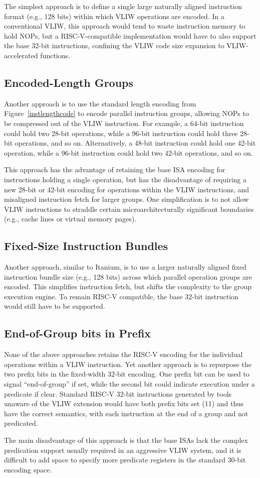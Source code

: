 The simplest approach is to define a single large naturally aligned
instruction format (e.g., 128 bits) within which VLIW operations are
encoded.  In a conventional VLIW, this approach would tend to waste
instruction memory to hold NOPs, but a RISC-V-compatible
implementation would have to also support the base 32-bit
instructions, confining the VLIW code size expansion to
VLIW-accelerated functions.

\subsection*{Encoded-Length Groups}

Another approach is to use the standard length encoding from
Figure~\ref{instlengthcode} to encode parallel instruction groups,
allowing NOPs to be compressed out of the VLIW instruction.  For
example, a 64-bit instruction could hold two 28-bit operations, while
a 96-bit instruction could hold three 28-bit operations, and so on.
Alternatively, a 48-bit instruction could hold one 42-bit operation,
while a 96-bit instruction could hold two 42-bit operations, and so
on.

This approach has the advantage of retaining the base ISA encoding for
instructions holding a single operation, but has the disadvantage of
requiring a new 28-bit or 42-bit encoding for operations within the
VLIW instructions, and misaligned instruction fetch for larger groups.
One simplification is to not allow VLIW instructions to straddle
certain microarchitecturally significant boundaries (e.g., cache lines
or virtual memory pages).

\subsection*{Fixed-Size Instruction Bundles}

Another approach, similar to Itanium, is to use a larger naturally
aligned fixed instruction bundle size (e.g., 128 bits) across which
parallel operation groups are encoded.  This simplifies instruction
fetch, but shifts the complexity to the group execution engine.  To
remain RISC-V compatible, the base 32-bit instruction would still have
to be supported.

\subsection*{End-of-Group bits in Prefix}

None of the above approaches retains the RISC-V encoding for the
individual operations within a VLIW instruction.  Yet another approach
is to repurpose the two prefix bits in the fixed-width 32-bit
encoding.  One prefix bit can be used to signal ``end-of-group'' if
set, while the second bit could indicate execution under a predicate
if clear.  Standard RISC-V 32-bit instructions generated by tools
unaware of the VLIW extension would have both prefix bits set (11) and
thus have the correct semantics, with each instruction at the end of a
group and not predicated.

The main disadvantage of this approach is that the base ISAs lack the
complex predication support usually required in an aggressive VLIW
system, and it is difficult to add space to specify more predicate
registers in the standard 30-bit encoding space.
